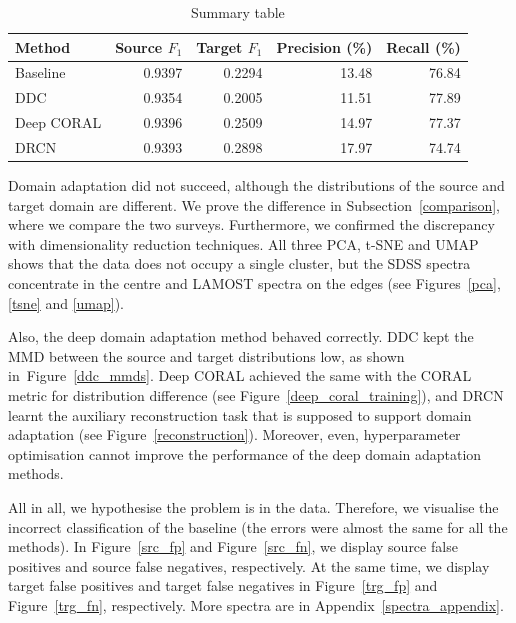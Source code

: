 \begin{table}
\begin{center}
\begin{tabular}{|l|r|r|r|r|}
	\hline
	Method & Source \(F_1\) & Target \(F_1\) & Precision (\%) & Recall (\%) \\
	\hline \hline
	Baseline & 0.9397 & 0.2294 & 13.48 & 76.84 \\ \hline
	DDC & 0.9354 & 0.2005 & 11.51 & 77.89 \\ \hline
	Deep CORAL & 0.9396 & 0.2509 & 14.97 & 77.37 \\ \hline
	DRCN & 0.9393 & 0.2898 & 17.97 & 74.74 \\ \hline
\end{tabular}
\end{center}
\caption{Summary table}
\label{summary}
\end{table}

Domain adaptation did not succeed,
although the distributions of the source and target domain are different.
We prove the difference in Subsection~\ref{comparison},
where we compare the two surveys.
Furthermore, we confirmed the discrepancy with dimensionality reduction techniques.
All three PCA, t-SNE and UMAP shows that the data does not occupy a single cluster,
but the SDSS spectra concentrate in the centre and LAMOST spectra on the edges
(see Figures~\ref{pca}, \ref{tsne} and \ref{umap}).

Also, the deep domain adaptation method behaved correctly.
DDC kept the MMD between the source and target distributions low,
as shown in~Figure~\ref{ddc_mmds}.
Deep CORAL achieved the same with the CORAL metric for distribution difference
(see Figure~\ref{deep_coral_training}),
and DRCN learnt the auxiliary reconstruction task
that is supposed to support domain adaptation
(see Figure~\ref{reconstruction}).
Moreover, even, hyperparameter optimisation cannot improve the performance of the deep domain adaptation methods.

All in all, we hypothesise the problem is in the data.
Therefore, we visualise the incorrect classification of the baseline
(the errors were almost the same for all the methods).
In Figure~\ref{src_fp} and Figure~\ref{src_fn}, we display source false positives and source false negatives, respectively.
At the same time, we display target false positives and target false negatives in Figure~\ref{trg_fp} and Figure~\ref{trg_fn}, respectively.
More spectra are in Appendix~\ref{spectra_appendix}.

